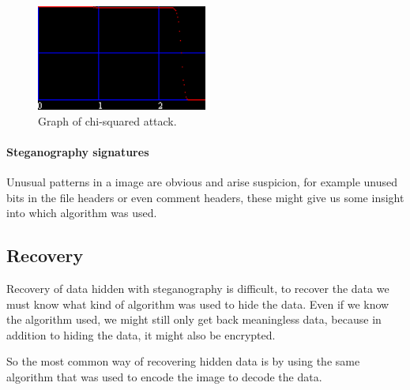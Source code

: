 \begin{figure}
	\centering
	\includegraphics[width=0.5\textwidth]{figures/ChiSquareAttack.png}
	\caption{Graph of chi-squared attack.}
	\label{fig:Chiattack}
\end{figure}

\paragraph*{Steganography signatures}
Unusual patterns in a image are obvious and arise suspicion, for example unused bits in the file headers or even comment headers, these might give us some insight into which algorithm was used.

\subsection{Recovery}
Recovery of data hidden with steganography is difficult, to recover the data we must know what kind of algorithm was used to hide the data.
Even if we know the algorithm used, we might still only get back meaningless data, because in addition to hiding the data, it might also be encrypted.

So the most common way of recovering hidden data is by using the same algorithm that was used to encode the image to decode the data.
